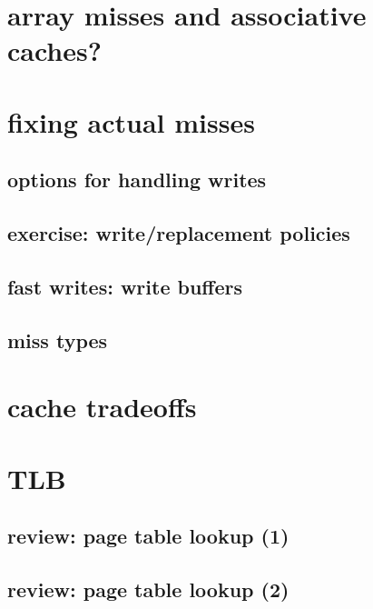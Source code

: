 \section{array misses and associative caches?}

\section{fixing actual misses}


\subsection{options for handling writes}


\subsection{exercise: write/replacement policies}


\subsection{fast writes: write buffers}


\subsection{miss types}


\section{cache tradeoffs}


\section{TLB}

\subsection{review: page table lookup (1)}


\subsection{review: page table lookup (2)}

